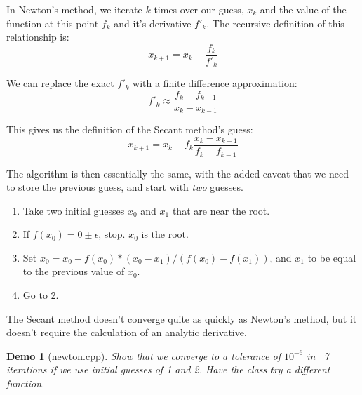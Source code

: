 \documentclass{article}
\theoremstyle{demo}
\newtheorem{demo}{Demo}[section]
\begin{document}
In Newton's method, we iterate $k$ times over our guess, $x_k$ and the value of
the function at this point $f_k$ and it's derivative $f'_k$.  The recursive
definition of this relationship is:
\begin{equation}
    x_{k+1} = x_k - \frac{f_k}{f'_k}
\end{equation}

We can replace the exact $f'_k$ with a finite difference approximation:
\begin{equation}
    f'_k \approx \frac{f_k - f_{k-1}}{x_k-x_{k-1}}
\end{equation}

This gives us the definition of the Secant method's guess:
\begin{equation}
    x_{k+1} = x_k - f_k\frac{x_k-x_{k-1}}{f_k-f_{k-1}}
\end{equation}

The algorithm is then essentially the same, with the added caveat that we need
to store the previous guess, and start with \textit{two} guesses.
\begin{enumerate}
    \item Take two initial guesses $x_0$ and $x_1$ that are near the root.
    \item If $f(x_0) = 0 \pm \epsilon$, stop.  $x_0$ is the root.
    \item Set $x_0 = x_0 - f(x_0)*(x_0-x_1)/(f(x_0)-f(x_1))$, and $x_1$ to be
        equal to the previous value of $x_0$.
    \item Go to 2.
\end{enumerate}

The Secant method doesn't converge quite as quickly as Newton's method, but it
doesn't require the calculation of an analytic derivative.

\begin{demo}[newton.cpp]
    Show that we converge to a tolerance of $10^{-6}$ in ~7 iterations if we
    use initial guesses of 1 and 2.  Have the class try a different function.
\end{demo}
\end{document}
